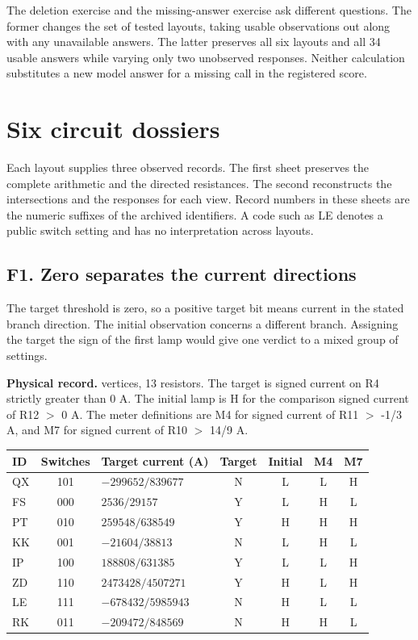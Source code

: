 \documentclass[12pt,letterpaper]{article}
\newcommand{\reading}[2]{\par\smallskip\textsf{\color{accent}\bfseries #1}\enspace #2\par}
\begin{document}
The deletion exercise and the missing-answer exercise ask different questions. The former changes the set of tested layouts, taking usable observations out along with any unavailable answers. The latter preserves all six layouts and all 34 usable answers while varying only two unobserved responses. Neither calculation substitutes a new model answer for a missing call in the registered score.

\clearpage

\section{Six circuit dossiers}Each layout supplies three observed records. The first sheet preserves the complete arithmetic and the directed resistances. The second reconstructs the intersections and the responses for each view. Record numbers in these sheets are the numeric suffixes of the archived identifiers. A code such as LE denotes a public switch setting and has no interpretation across layouts.

\subsection*{F1. Zero separates the current directions}\label{dsF1}

The target threshold is zero, so a positive target bit means current in the stated branch direction. The initial observation concerns a different branch. Assigning the target the sign of the first lamp would give one verdict to a mixed group of settings.

\reading{Physical record.}{6 vertices, 13 resistors. The target is signed current on R4 strictly greater than $0$ A. The initial lamp is H for the comparison signed current of R12 $>$ 0 A. The meter definitions are M4 for signed current of R11 $>$ -1/3 A, and M7 for signed current of R10 $>$ 14/9 A.}

\begin{center}{\small\setlength{\tabcolsep}{4pt}\begin{tabularx}{\linewidth}{@{}lcYcccc@{}}\toprule
ID & Switches & Target current (A) & Target & Initial & M4 & M7\\ \midrule
QX & 101 & $-299652/839677$ & N & L & L & H\\
FS & 000 & $2536/29157$ & Y & L & H & L\\
PT & 010 & $259548/638549$ & Y & H & H & H\\
KK & 001 & $-21604/38813$ & N & L & H & L\\
IP & 100 & $188808/631385$ & Y & L & L & H\\
ZD & 110 & $2473428/4507271$ & Y & H & L & H\\
LE & 111 & $-678432/5985943$ & N & H & L & L\\
RK & 011 & $-209472/848569$ & N & H & H & L\\ \bottomrule\end{tabularx}}
\end{center}
\end{document}
